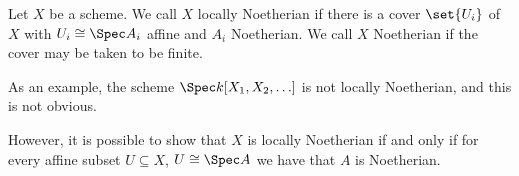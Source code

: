 Let $X$ be a scheme. We call $X$ locally Noetherian if there is a cover
$\set{U_i}$ of $X$ with $U_i \cong \Spec A_i$ affine and $A_i$ Noetherian.
We call $X$ Noetherian if the cover may be taken to be finite.

As an example, the scheme $\Spec k[X_1, X_2, \ldots]$ is not locally Noetherian,
and this is not obvious.

However, it is possible to show that $X$ is locally Noetherian if and only if
for every affine subset $U \subseteq X$, $U \cong \Spec A$ we have that  $A$ is
Noetherian.
